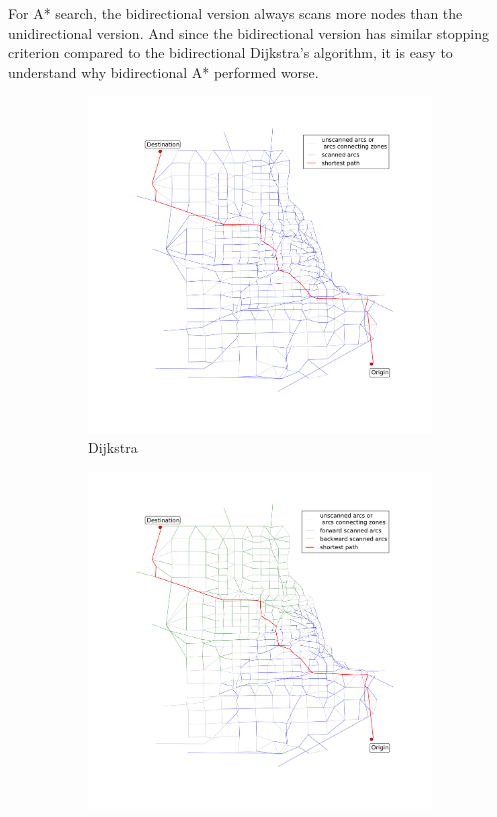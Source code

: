 For A* search,
the bidirectional version always scans more nodes than the unidirectional version.
And since the bidirectional version has similar stopping criterion compared to the bidirectional Dijkstra's algorithm,
it is easy to understand why bidirectional A* performed worse.

\begin{figure}
    \centering
    \begin{subfigure}{.5\textwidth}
        \centering
        \includegraphics[width=\textwidth,trim=120px 120px 48px 120px,clip]{img/chicago_dijkstra}
        \caption{Dijkstra}
        \label{fig:chicago_dijkstra}
    \end{subfigure}%
    \begin{subfigure}{.5\textwidth}
        \centering
        \includegraphics[width=\textwidth,trim=120px 120px 48px 120px,clip]{img/chicago_bidirect}

\end{subfigure}
\end{figure}
